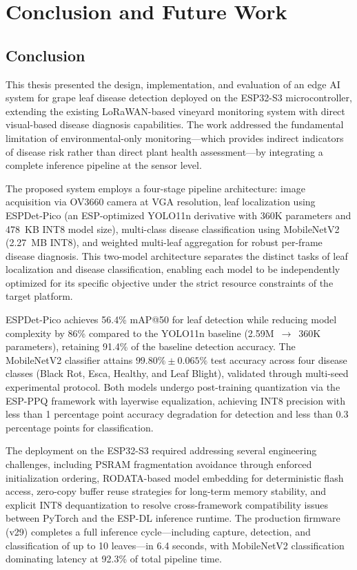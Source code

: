 \chapter{Conclusion and Future Work}
\label{chap:conclusion}

\section{Conclusion}

This thesis presented the design, implementation, and evaluation of an edge AI system for grape leaf disease detection deployed on the ESP32-S3 microcontroller, extending the existing LoRaWAN-based vineyard monitoring system with direct visual-based disease diagnosis capabilities. The work addressed the fundamental limitation of environmental-only monitoring---which provides indirect indicators of disease risk rather than direct plant health assessment---by integrating a complete inference pipeline at the sensor level.

The proposed system employs a four-stage pipeline architecture: image acquisition via OV3660 camera at VGA resolution, leaf localization using ESPDet-Pico (an ESP-optimized YOLO11n derivative with 360K parameters and 478~KB INT8 model size), multi-class disease classification using MobileNetV2 (2.27~MB INT8), and weighted multi-leaf aggregation for robust per-frame disease diagnosis. This two-model architecture separates the distinct tasks of leaf localization and disease classification, enabling each model to be independently optimized for its specific objective under the strict resource constraints of the target platform.

ESPDet-Pico achieves 56.4\% mAP@50 for leaf detection while reducing model complexity by 86\% compared to the YOLO11n baseline (2.59M~$\rightarrow$~360K parameters), retaining 91.4\% of the baseline detection accuracy. The MobileNetV2 classifier attains $99.80\% \pm 0.065\%$ test accuracy across four disease classes (Black Rot, Esca, Healthy, and Leaf Blight), validated through multi-seed experimental protocol. Both models undergo post-training quantization via the ESP-PPQ framework with layerwise equalization, achieving INT8 precision with less than 1 percentage point accuracy degradation for detection and less than 0.3 percentage points for classification.

The deployment on the ESP32-S3 required addressing several engineering challenges, including PSRAM fragmentation avoidance through enforced initialization ordering, RODATA-based model embedding for deterministic flash access, zero-copy buffer reuse strategies for long-term memory stability, and explicit INT8 dequantization to resolve cross-framework compatibility issues between PyTorch and the ESP-DL inference runtime. The production firmware (v29) completes a full inference cycle---including capture, detection, and classification of up to 10 leaves---in 6.4 seconds, with MobileNetV2 classification dominating latency at 92.3\% of total pipeline time.

